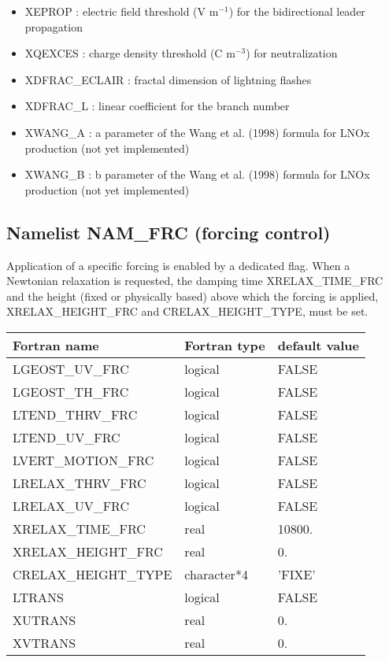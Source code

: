 \begin{itemize}
  \item XEPROP : electric field threshold (V m$^{-1}$) for the bidirectional leader propagation
  \item XQEXCES : charge density threshold (C m$^{-3}$) for neutralization
  \item XDFRAC\_ECLAIR : fractal dimension of lightning flashes
  \item XDFRAC\_L : linear coefficient for the branch number
  \item XWANG\_A : a parameter of the Wang et al. (1998) formula for LNOx production (not yet implemented)
  \item XWANG\_B : b parameter of the Wang et al. (1998) formula for LNOx production (not yet implemented)
\end{itemize}

\subsection{Namelist NAM\_FRC (forcing control)}

Application of a specific forcing is enabled by a dedicated flag. When a
Newtonian relaxation is requested, the damping time XRELAX\_TIME\_FRC and the
height (fixed or physically based) above which the forcing is applied,
XRELAX\_HEIGHT\_FRC and CRELAX\_HEIGHT\_TYPE, must be set.

\begin{center}
\begin{tabular} {|l|l|l|}
\hline
Fortran name & Fortran type & default value \\
\hline
LGEOST\_UV\_FRC      & logical      & FALSE \\
LGEOST\_TH\_FRC      & logical      & FALSE \\
LTEND\_THRV\_FRC     & logical      & FALSE \\
LTEND\_UV\_FRC     & logical      & FALSE \\
LVERT\_MOTION\_FRC   & logical      & FALSE \\
LRELAX\_THRV\_FRC    & logical      & FALSE \\
LRELAX\_UV\_FRC      & logical      & FALSE \\
XRELAX\_TIME\_FRC    & real         & 10800. \\
XRELAX\_HEIGHT\_FRC  & real         & 0. \\
CRELAX\_HEIGHT\_TYPE &  character*4 & 'FIXE' \\
LTRANS               & logical      & FALSE \\
XUTRANS              & real         & 0. \\
XVTRANS              & real         & 0. \\
\hline
\end{tabular}
\end{center}

